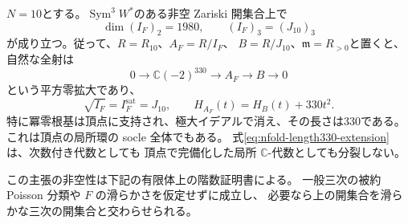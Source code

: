 \begin{theorem}
\label{thm:nfold-eightfold-square-zero}
$N=10$とする。$\operatorname{Sym}^3W^*$のある非空 Zariski 開集合上で
\[
 \dim(I_F)_2=1980,\qquad (I_F)_3=(J_{10})_3
\]
が成り立つ。従って、$R=R_{10}$、$A_F=R/I_F$、
$B=R/J_{10}$、$\mathfrak m=R_{>0}$と置くと、自然な全射は
\begin{equation}\label{eq:nfold-length330-extension}
 0\longrightarrow\mathbb C(-2)^{330}\longrightarrow A_F
 \longrightarrow B\longrightarrow0
\end{equation}
という平方零拡大であり、
\[
 \sqrt{I_F}=I_F^{\mathrm{sat}}=J_{10},\qquad
 H_{A_F}(t)=H_B(t)+330t^2.
\]
特に冪零根基は頂点に支持され、極大イデアルで消え、その長さは330である。
これは頂点の局所環の socle 全体でもある。
式\eqref{eq:nfold-length330-extension}は、次数付き代数としても
頂点で完備化した局所 $\mathbb C$-代数としても分裂しない。

この主張の非空性は下記の有限体上の階数証明書による。
一般三次の被約 Poisson 分類や $F$ の滑らかさを仮定せずに成立し、
必要なら上の開集合を滑らかな三次の開集合と交わらせられる。
\end{theorem}
